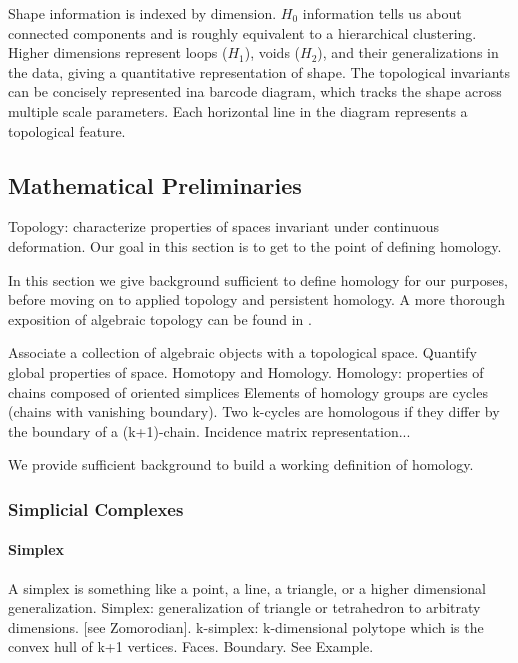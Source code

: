 Shape information is indexed by dimension.
$H_0$ information tells us about connected components and is roughly equivalent to a hierarchical clustering.
Higher dimensions represent loops ($H_1$), voids ($H_2$), and their generalizations in the data, giving a quantitative representation of shape.
The topological invariants can be concisely represented ina barcode diagram, which tracks the shape across multiple scale parameters.
Each horizontal line in the diagram represents a topological feature.


\subsection{Mathematical Preliminaries}

Topology: characterize properties of spaces invariant under continuous deformation.
Our goal in this section is to get to the point of defining homology.

In this section we give background sufficient to define homology for our purposes, before moving on to applied topology and persistent homology.
A more thorough exposition of algebraic topology can be found in \cite{Hatcher:2002ut}.

Associate a collection of algebraic objects with a topological space.
Quantify global properties of space.
Homotopy and Homology.
Homology: properties of chains composed of oriented simplices
Elements of homology groups are cycles (chains with vanishing boundary).
Two k-cycles are homologous if they differ by the boundary of a (k+1)-chain.
Incidence matrix representation...

We provide sufficient background to build a working definition of homology.

\subsubsection{Simplicial Complexes}

\paragraph{Simplex}

A simplex is something like a point, a line, a triangle, or a higher dimensional generalization.
Simplex: generalization of triangle or tetrahedron to arbitraty dimensions. [see Zomorodian].
k-simplex: k-dimensional polytope which is the convex hull of k+1 vertices.
Faces. Boundary.
See Example.

